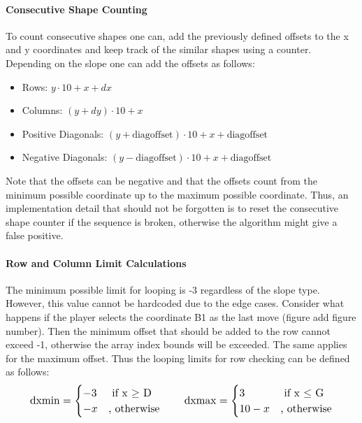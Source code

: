 \documentclass[conference]{IEEEtran}
\begin{document}
\paragraph{Consecutive Shape Counting}
To count consecutive shapes one can, add the previously defined offsets to the x and y coordinates and keep track of the similar shapes using a counter. Depending on the slope one can add the offsets as follows:
\begin{itemize}
\item Rows: \(y \cdot 10 + x + dx \)
\item Columns: \((y + dy) \cdot 10 + x\) 
\item Positive Diagonals: \((y + \text{diagoffset}) \cdot 10 + x + \text{diagoffset}\)
\item Negative Diagonals: \((y - \text{diagoffset}) \cdot 10 + x + \text{diagoffset}\)
\end{itemize} \hfill \hfill
\par Note that the offsets can be negative and that the offsets count from the minimum possible coordinate up to the maximum possible coordinate. Thus, an implementation detail that should not be forgotten is to reset the consecutive shape counter if the sequence is broken, otherwise the algorithm might give a false positive. \\
\paragraph{Row and Column Limit Calculations} The minimum possible limit for looping is -3 regardless of the slope type. However, this value cannot be hardcoded due to the edge cases. Consider what happens if the player selects the coordinate B1 as the last move (figure add figure number). Then the minimum offset that should be added to the row cannot exceed -1, otherwise the array index bounds will be exceeded. The same applies for the maximum offset. Thus the looping limits for row checking can be defined as follows: \begin{gather*}\resizebox{0.9\hsize}{!}{$
\text{dxmin} =
\begin{cases}
 -3 &\text{ if x \(\geq\) D} \\ -x &\text{, otherwise} 
\end{cases} \qquad 
\text{dxmax} =
\begin{cases}
 3 &\text{ if x \(\leq\) G} \\ 10-x &\text{, otherwise} 
\end{cases}$}
\end{gather*} \\
\end{document}
